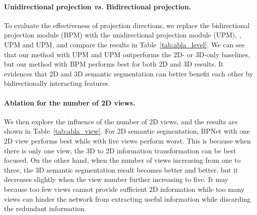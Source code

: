 \documentclass[final]{cvpr}
\begin{document}
\vspace{-4mm}
\paragraph{Unidirectional projection \textit{vs.} Bidirectional projection.}
To evaluate the effectiveness of projection directions, we replace the bidirectional projection module (BPM) with the unidirectional projection module (UPM), \ie, UPM and UPM, and compare the results in Table~\ref{tab:abla_level}.
We can see that our method with UPM and UPM outperforms the 2D- or 3D-only baselines, but our method with BPM performs best for both 2D and 3D results. 
It evidences that 2D and 3D semantic segmentation can better benefit each other by bidirectionally interacting features.





\begin{table}[!t]
	\centering
	\renewcommand{\tabcolsep}{6.5pt}
		\vspace{0.5mm}
		\caption{
		2D and 3D semantic segmentation results of different view numbers on the validation set of ScanNetV2.
	}
	\label{tab:abla_view}
\end{table}


\vspace{-4mm}
\paragraph{Ablation for the number of 2D views.}


We then explore the influence of the number of 2D views, and the results are shown in Table~\ref{tab:abla_view}.
For 2D semantic segmentation, BPNet with one 2D view performs best while with five views perform worst.
This is because when there is only one view, the 3D to 2D information transformation can be best focused.
On the other hand, when the number of views increasing from one to three, the 3D semantic segmentation result becomes better and better, but it decreases slightly when the view number further increasing to five.
It may because too few views cannot provide sufficient 2D information while too many views can hinder the network from extracting useful information while discarding the redundant information.
\end{document}
